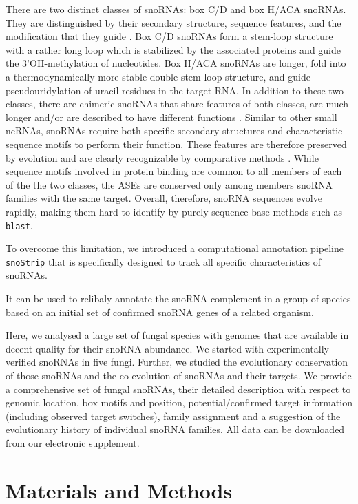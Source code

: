 \documentclass[preprint,3p,times,twocolumn]{elsarticle}
\newcommand{\snostrip}{\texttt{snoStrip}}
\begin{document}
There are two distinct classes of snoRNAs: box C/D and box H/ACA snoRNAs.
They are distinguished by their secondary structure, sequence features, and
the modification that they guide \cite{****}.  Box C/D snoRNAs form a
stem-loop structure with a rather long loop which is stabilized by the
associated proteins and guide the 3'OH-methylation of nucleotides.  Box
H/ACA snoRNAs are longer, fold into a thermodynamically more stable double
stem-loop structure, and guide pseudouridylation of uracil residues in the
target RNA.  In addition to these two classes, there are chimeric snoRNAs
that share features of both classes, are much longer and/or are described
to have different functions \cite{****}. Similar to other small ncRNAs,
snoRNAs require both specific secondary structures and characteristic
sequence motifs to perform their function. These features are therefore
preserved by evolution and are clearly recognizable by comparative methods
\cite{****}. While sequence motifs involved in protein binding are common
to all members of each of the the two classes, the ASEs are conserved only
among members snoRNA families with the same target. Overall, therefore,
snoRNA sequences evolve rapidly, making them hard to identify by purely
sequence-base methods such as \texttt{blast}. 

To overcome this limitation, we introduced a computational annotation
pipeline \snostrip \cite{Bartschat:2014} that is specifically designed to
track all specific characteristics of snoRNAs.


It can be used to relibaly annotate the snoRNA complement in a group of species based on an initial set of confirmed snoRNA genes of a related organism. 

Here, we analysed a large set of fungal species with genomes that are available in decent quality for their snoRNA abundance. 
We started with experimentally verified snoRNAs in five fungi.
Further, we studied the evolutionary conservation of those snoRNAs and the co-evolution of snoRNAs and their targets. We provide a comprehensive set of fungal snoRNAs, their detailed description with respect to genomic location, box motifs and position, potential/confirmed target information (including observed target switches), family assignment and a suggestion of the evolutionary history of individual snoRNA families. 
All data can be downloaded from our electronic supplement. 


\section{Materials and Methods}
\end{document}
